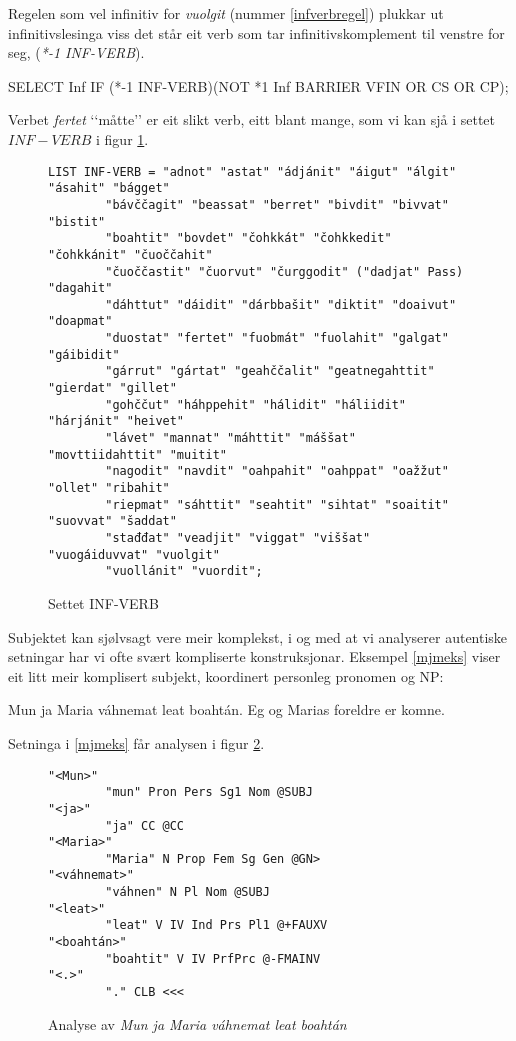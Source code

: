 \documentclass[a4paper,nynorsk]{article}
\begin{document}
Regelen som vel infinitiv for \emph{vuolgit} (nummer \ref{infverbregel}) plukkar ut infinitivslesinga viss det står eit verb som tar infinitivskomplement til venstre for seg, (\textit{*-1 INF-VERB}). %

\begin{example}\label{infverbregel}
SELECT Inf IF (*-1 INF-VERB)(NOT *1 Inf BARRIER VFIN OR CS OR CP);
\end{example}

Verbet \emph{fertet} ‘‘måtte’’ er eit slikt verb, eitt blant mange, som vi kan sjå i settet $INF-VERB$ i figur \ref{infverbsett}. %


\begin{figure}[htbp]
\begin{center}
\begin{verbatim}
LIST INF-VERB = "adnot" "astat" "ádjánit" "áigut" "álgit" "ásahit" "bágget" 
		"bávččagit" "beassat" "berret" "bivdit" "bivvat" "bistit" 
		"boahtit" "bovdet" "čohkkát" "čohkkedit" "čohkkánit" "čuoččahit" 
		"čuoččastit" "čuorvut" "čurggodit" ("dadjat" Pass) "dagahit" 
		"dáhttut" "dáidit" "dárbbašit" "diktit" "doaivut" "doapmat" 
		"duostat" "fertet" "fuobmát" "fuolahit" "galgat" "gáibidit" 
		"gárrut" "gártat" "geahččalit" "geatnegahttit" "gierdat" "gillet" 
		"gohččut" "háhppehit" "hálidit" "háliidit" "hárjánit" "heivet" 
		"lávet" "mannat" "máhttit" "máššat" "movttiidahttit" "muitit" 
		"nagodit" "navdit" "oahpahit" "oahppat" "oažžut" "ollet" "ribahit" 
		"riepmat" "sáhttit" "seahtit" "sihtat" "soaitit" "suovvat" "šaddat" 
		"stađđat" "veadjit" "viggat" "viššat" "vuogáiduvvat" "vuolgit" 
		"vuollánit" "vuordit";
\end{verbatim}
\caption{Settet INF-VERB}
\label{infverbsett}
\end{center}
\end{figure}

Subjektet kan sjølvsagt vere meir komplekst, i og med at vi analyserer autentiske setningar har vi ofte svært kompliserte konstruksjonar. Eksempel \ref{mjmeks} viser eit litt meir komplisert subjekt, koordinert personleg pronomen og NP: %

\begin{example}\label{mjmeks}
\gll Mun ja Maria váhnemat leat boahtán.
     Eg  og Marias foreldre er  komne.
\gln     
\glend
\end{example}%


Setninga i \ref{mjmeks} får analysen i figur \ref{mjam}. %

\begin{figure}[htbp]
\begin{center}
\begin{verbatim}
"<Mun>"
        "mun" Pron Pers Sg1 Nom @SUBJ
"<ja>"
        "ja" CC @CC
"<Maria>"
        "Maria" N Prop Fem Sg Gen @GN>
"<váhnemat>"
        "váhnen" N Pl Nom @SUBJ
"<leat>"
        "leat" V IV Ind Prs Pl1 @+FAUXV
"<boahtán>"
        "boahtit" V IV PrfPrc @-FMAINV
"<.>"
        "." CLB <<<
\end{verbatim}
\caption{Analyse av \textit{Mun ja Maria váhnemat leat boahtán}}
\label{mjam}
\end{center}
\end{figure}
\end{document}
